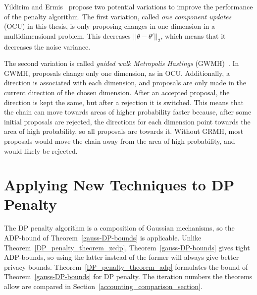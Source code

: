 \documentclass[english,twoside,openright]{HYgraduMLDS}
\begin{document}
Yildirim and Ermis~\cite{YildirimE19} propose two potential variations to improve the
performance of the penalty algorithm. The first variation, called
\emph{one component updates} (OCU) in this thesis, is only proposing
changes in one dimension in a multidimensional problem. This decreases
\(||\theta - \theta'||_2\), which means that it decreases the noise variance.

The second variation is called \emph{guided walk Metropolis Hastings}
(GWMH)~\cite{YildirimE19}.
In GWMH, proposals change only one dimension, as in OCU. Additionally, a direction
is associated with each dimension, and proposals are only made in the current
direction of the chosen dimension. After an accepted proposal, the direction is
kept the same, but after a rejection it is switched. This means that the chain can
move towards areas of higher probability faster because, after some initial
proposals are rejected, the directions for each dimension point towards the
area of high probability, so all proposals are towards it. Without GRMH, most
proposals would move the chain away from the area of high probability, and
would likely be rejected.

\section{Applying New Techniques to DP Penalty}\label{dp_penalty_adp_section}

The DP penalty algorithm is a composition of Gaussian mechanisms, so
the ADP-bound of Theorem~\ref{gauss-DP-bounds} is applicable. Unlike
Theorem~\ref{DP_penalty_theorem_zcdp}, Theorem~\ref{gauss-DP-bounds}
gives tight ADP-bounds, so using the latter instead of the former will
always give better privacy bounds. Theorem~\ref{DP_penalty_theorem_adp}
formulates the bound of Theorem~\ref{gauss-DP-bounds} for DP penalty.
The iteration numbers the theorems allow are compared in
Section~\ref{accounting_comparison_section}.
\end{document}
